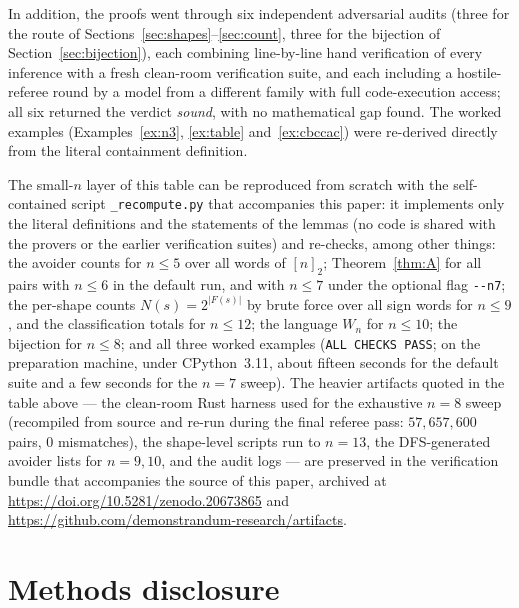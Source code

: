 \documentclass[11pt]{article}
\theoremstyle{definition}
\theoremstyle{remark}
\newcommand{\nn}{[n]_2}
\newcommand{\Wn}{W_n}
\begin{document}
In addition, the proofs went through six independent adversarial audits
(three for the route of Sections~\ref{sec:shapes}--\ref{sec:count}, three
for the bijection of Section~\ref{sec:bijection}), each combining
line-by-line hand verification of every inference with a fresh clean-room
verification suite, and each including a hostile-referee round by a model
from a different family with full code-execution access; all six returned
the verdict \emph{sound}, with no mathematical gap found. The worked
examples (Examples~\ref{ex:n3}, \ref{ex:table} and~\ref{ex:cbccac}) were
re-derived directly from the literal containment definition.

The small-$n$ layer of this table can be reproduced from scratch with the
self-contained script \texttt{\_recompute.py} that accompanies this paper:
it implements only the literal definitions and the statements of the lemmas
(no code is shared with the provers or the earlier verification suites) and
re-checks, among other things: the avoider counts for $n\le5$ over all
words of $\nn$; Theorem~\ref{thm:A} for all pairs with $n\le6$ in the
default run, and with $n\le7$ under the optional flag \texttt{-{}-n7}; the
per-shape counts $N(s)=2^{|F(s)|}$ by brute force over all sign words for
$n\le9$, and the classification totals for $n\le12$; the language $\Wn$ for
$n\le10$; the bijection for $n\le8$; and all three worked examples
(\texttt{ALL CHECKS PASS}; on the preparation machine, under CPython~3.11,
about fifteen seconds for the default suite and a few seconds for the $n=7$
sweep). The heavier artifacts quoted in the table above --- the clean-room
Rust harness used for the exhaustive $n=8$ sweep (recompiled from source
and re-run during the final referee pass: $57{,}657{,}600$ pairs, $0$
mismatches), the shape-level scripts run to $n=13$, the DFS-generated
avoider lists for $n=9,10$, and the audit logs --- are preserved in the
verification bundle that accompanies the source of this paper, archived at
\url{https://doi.org/10.5281/zenodo.20673865} and
\url{https://github.com/demonstrandum-research/artifacts}.

\section{Methods disclosure}\label{app:methods}
\end{document}
